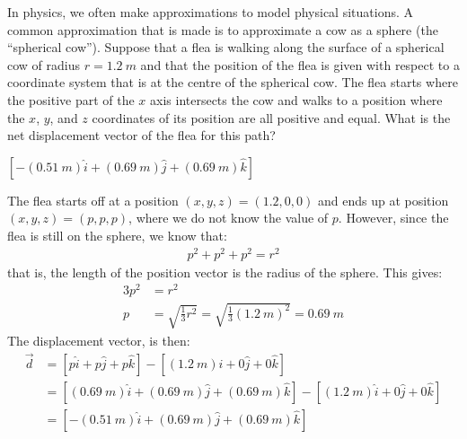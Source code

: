 \question In physics, we often make approximations to model physical situations. A common approximation that is made is to approximate a cow as a sphere (the ``spherical cow''). Suppose that a flea is walking along the surface of a spherical cow of radius $r=\SI{1.2}{m}$ and that the position of the flea is given with respect to a coordinate system that is at the centre of the spherical cow. The flea starts where the positive part of the $x$ axis intersects the cow and walks to a position where the $x$, $y$, and $z$ coordinates of its position are all positive and equal. What is the net displacement vector of the flea for this path?
\begin{finalanswer}
$[-(\SI{0.51}{m})\hat i+(\SI{0.69}{m})\hat j+(\SI{0.69}{m})\hat k]$
\end{finalanswer}
\begin{solution}
The flea starts off at a position $(x,y,z)=(1.2,0,0)$ and ends up at position $(x,y,z)=(p,p,p)$, where we do not know the value of $p$. However, since the flea is still on the sphere, we know that:
\begin{align*}
p^2+p^2+p^2 = r^2
\end{align*}
that is, the length of the position vector is the radius of the sphere. This gives:
\begin{align*}
3p^2 &=r^2\\
p &= \sqrt{\frac{1}{3}r^2}=\sqrt{\frac{1}{3}(\SI{1.2}{m})^2}=\SI{0.69}{m}
\end{align*}
The displacement vector, is then:
\begin{align*}
\vec d &= [p\hat i+p\hat j +p\hat k]-[(\SI{1.2}{m})\hat i+0\hat j +0\hat k]\\
&=[(\SI{0.69}{m})\hat i+(\SI{0.69}{m})\hat j +(\SI{0.69}{m})\hat k]-[(\SI{1.2}{m})\hat i+0\hat j +0\hat k]\\
&=[-(\SI{0.51}{m})\hat i+(\SI{0.69}{m})\hat j+(\SI{0.69}{m})\hat k]
\end{align*}

\end{solution}

